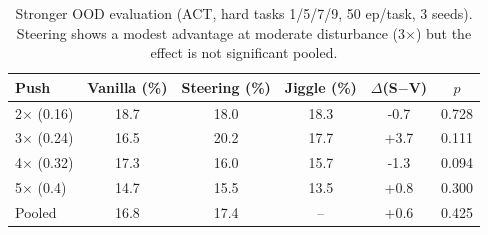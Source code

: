 \begin{table}[t]
\centering
\small
\caption{Stronger OOD evaluation (ACT, hard tasks 1/5/7/9, 50 ep/task, 3 seeds). Steering shows a modest advantage at moderate disturbance (3$\times$) but the effect is not significant pooled.}
\label{tab:stronger_ood}
\begin{tabular}{lccccc}
\toprule
Push & Vanilla (\%) & Steering (\%) & Jiggle (\%) & $\Delta$(S$-$V) & $p$ \\
\midrule
2$\times$ (0.16) & 18.7 & 18.0 & 18.3 & -0.7 & 0.728 \\
3$\times$ (0.24) & 16.5 & 20.2 & 17.7 & +3.7 & 0.111 \\
4$\times$ (0.32) & 17.3 & 16.0 & 15.7 & -1.3 & 0.094 \\
5$\times$ (0.4) & 14.7 & 15.5 & 13.5 & +0.8 & 0.300 \\
\midrule
Pooled & 16.8 & 17.4 & -- & +0.6 & 0.425 \\
\bottomrule
\end{tabular}
\end{table}
